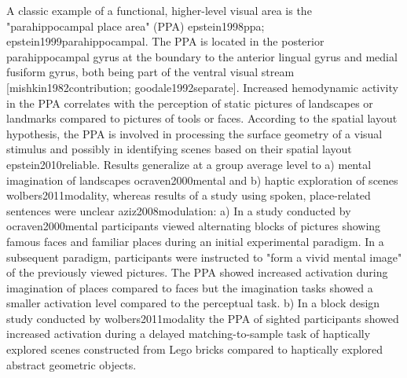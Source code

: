 \documentclass[english]{article}
\begin{document}
A classic example of a functional, higher-level visual area is the "parahippocampal place area" (PPA) {epstein1998ppa; epstein1999parahippocampal}. The PPA is located in the posterior parahippocampal gyrus at the boundary to the anterior lingual gyrus and medial fusiform gyrus, both being part of the ventral visual stream [mishkin1982contribution; goodale1992separate]. Increased hemodynamic activity in the PPA correlates with the perception of static pictures of landscapes or landmarks compared to pictures of tools or faces. According to the spatial layout hypothesis, the PPA is involved in processing the surface geometry of a visual stimulus and possibly in identifying scenes based on their spatial layout {epstein2010reliable}.
Results generalize at a group average level to a) mental imagination of landscapes {ocraven2000mental} and b) haptic exploration of scenes {wolbers2011modality},  whereas results of a study using spoken, place-related sentences were unclear  {aziz2008modulation}:
a) In a study conducted by {ocraven2000mental} participants viewed alternating blocks of pictures showing famous faces and familiar places during an initial experimental paradigm. In a subsequent paradigm, participants were instructed to "form a vivid mental image" of the previously viewed pictures. The PPA showed increased activation during imagination of places compared to faces but the imagination tasks showed a smaller activation level compared to the perceptual task. 
b) In a block design study conducted by {wolbers2011modality} the PPA of sighted participants showed increased activation during a delayed matching-to-sample task of haptically explored scenes constructed from Lego bricks compared to haptically explored abstract geometric objects.
\end{document}
